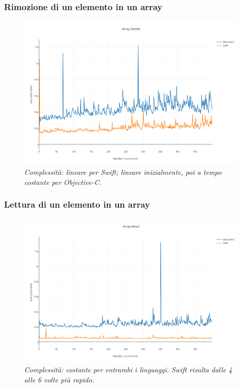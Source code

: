\subsubsection{Rimozione di un elemento in un array}
\begin{figure}[H]
      \centering
      \includegraphics[scale=0.50]{immagini/array_delete.png}
            \vspace{0.8cm}
            \caption{\textit{Complessità: lineare per Swift; lineare inizialmente, poi a tempo costante per Objective-C.}}
\end{figure}
\subsubsection{Lettura di un elemento in un array}
\begin{figure}[H]
      \centering
      \includegraphics[scale=0.50]{immagini/array_read.png}
            \vspace{0.8cm}
            \caption{\textit{Complessità: costante per entrambi i linguaggi. Swift risulta dalle 4 alle 6 volte più rapido.}}
\end{figure}
